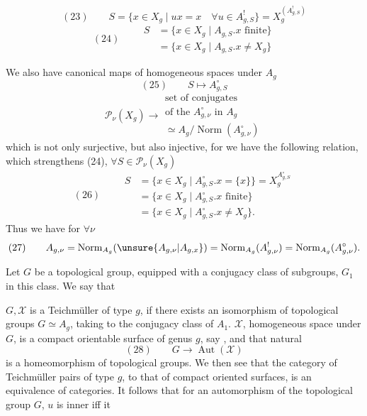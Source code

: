\[
(23)\qquad S=\{x\in X_g\mid ux=x\quad\forall u\in A_{g,S}^!\}
=X_g^{(A_{g,S}^!)}
\]
\[
(24)\qquad\begin{aligned}
S&=\{x\in X_g\mid A_{g,S}.x\text{ finite}\}\\
 &=\{x\in X_g\mid A_{g,S}.x\ne X_g\}
\end{aligned}
\]

We also have  canonical maps
of homogeneous spaces under $A_g$
\[
(25)\qquad S\longmapsto A_{g,S}^{\circ}
\]
\[
\mathcal P_\nu(X_g)\longrightarrow
\begin{gathered}
\text{set of conjugates}\\
\text{of the }A_{g,\nu}^{\circ}\text{ in }A_g\\
\simeq A_g/\operatorname{Norm}(A_{g,\nu}^{\circ})
\end{gathered}
\]
which is not only surjective, but also
injective, for we have the following relation, which
strengthens  (24), $\forall S\in\mathcal P_\nu(X_g)$
\[
(26)\qquad\begin{aligned}
S&=\{x\in X_g\mid A_{g,S}^{\circ}.x=\{x\}\}=X_g^{A_{g,S}^{\circ}}\\
 &=\{x\in X_g\mid A_{g,S}^{\circ}.x\text{ finite}\}\\
 &=\{x\in X_g\mid A_{g,S}^{\circ}.x\ne X_g\}.
\end{aligned}
\]
 Thus we have for $\forall\nu$
\[
(27)\qquad A_{g,\nu}=\operatorname{Norm}_{A_g}(\unsure{A_{g,\nu}|A_{g,x}})
=\operatorname{Norm}_{A_g}(A_{g,\nu}^!)=\operatorname{Norm}_{A_g}(A_{g,\nu}^{\circ}).
\]

Let $G$ be a topological group, equipped
with a conjugacy class  of subgroups,
 $G_1$ in this class. We say that

$G,\mathcal X$ is a Teichmüller  
of type $g$, if there exists an isomorphism of
topological groups $G\simeq A_g$, taking
 to the conjugacy class of $A_1$.
 $\mathcal X$, 
 homogeneous space
under $G$, is  a
compact orientable surface of genus $g$,
 say , and that
 
natural
\[
(28)\qquad G\longrightarrow\operatorname{Aut}(\mathcal X)
\]
is a homeomorphism of topological groups.
We then see that 
the category of
Teichmüller pairs of type $g$, to
that of compact oriented surfaces, is
an equivalence of categories. It follows
that  for an automorphism  of the
topological group $G$, $u$ is inner iff it

